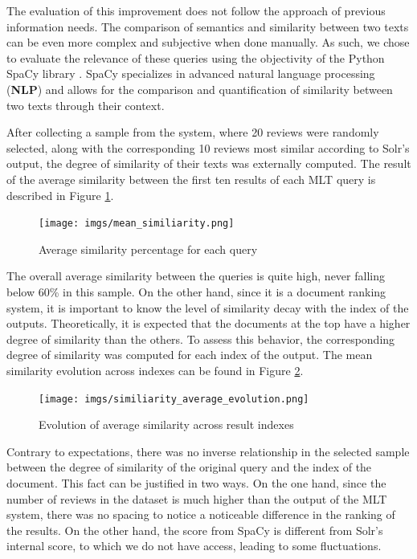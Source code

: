 \documentclass[sigconf]{acmart}
\begin{document}
The evaluation of this improvement does not follow the approach of previous information needs. The comparison of semantics and similarity between two texts can be even more complex and subjective when done manually. As such, we chose to evaluate the relevance of these queries using the objectivity of the Python SpaCy library \cite{Python_Spacy}. SpaCy specializes in advanced natural language processing (\textbf{NLP}) and allows for the comparison and quantification of similarity between two texts through their context.

After collecting a sample from the system, where 20 reviews were randomly selected, along with the corresponding 10 reviews most similar according to Solr's output, the degree of similarity of their texts was externally computed. The result of the average similarity between the first ten results of each MLT query is described in Figure \ref{fig:avg_simi}.

\begin{figure}[h]
  \centering
  \texttt{[image: imgs/mean\_similiarity.png]}
  \caption{Average similarity percentage for each query}
  \label{fig:avg_simi}
\end{figure}


The overall average similarity between the queries is quite high, never falling below 60\% in this sample. On the other hand, since it is a document ranking system, it is important to know the level of similarity decay with the index of the outputs. Theoretically, it is expected that the documents at the top have a higher degree of similarity than the others. To assess this behavior, the corresponding degree of similarity was computed for each index of the output. The mean similarity evolution across indexes can be found in Figure \ref{fig:simi_avg_evo}.


\begin{figure}[h]
  \centering
  \texttt{[image: imgs/similiarity\_average\_evolution.png]}
  \caption{Evolution of average similarity across result indexes}
  \label{fig:simi_avg_evo}
\end{figure}


Contrary to expectations, there was no inverse relationship in the selected sample between the degree of similarity of the original query and the index of the document. This fact can be justified in two ways. On the one hand, since the number of reviews in the dataset is much higher than the output of the MLT system, there was no spacing to notice a noticeable difference in the ranking of the results. On the other hand, the score from SpaCy is different from Solr's internal score, to which we do not have access, leading to some fluctuations.
\end{document}
